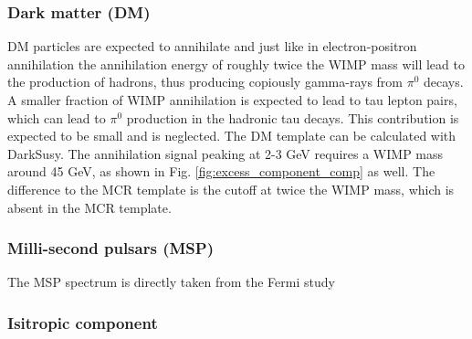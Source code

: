 %
%
%


\subsubsection{Dark matter (DM)}
DM particles are expected to annihilate and just like in electron-positron annihilation the annihilation energy of
roughly twice the WIMP mass will lead to the production of hadrons, thus producing copiously gamma-rays from $\pi^0$ decays. A smaller fraction of WIMP annihilation is expected to lead to tau lepton pairs, which can lead to $\pi^0$ production in the hadronic tau decays. This contribution is expected to be small and is neglected. The DM template can be calculated with DarkSusy.  The annihilation signal peaking at 2-3 GeV requires a WIMP mass around 45 GeV, as shown in Fig. \ref{fig:excess_component_comp} as well. The difference to the MCR template is the cutoff at twice the WIMP mass, which is absent in the MCR template.

%


\subsubsection{Milli-second pulsars (MSP)}

The MSP spectrum is directly taken from the Fermi study 

\subsubsection{Isitropic component}

